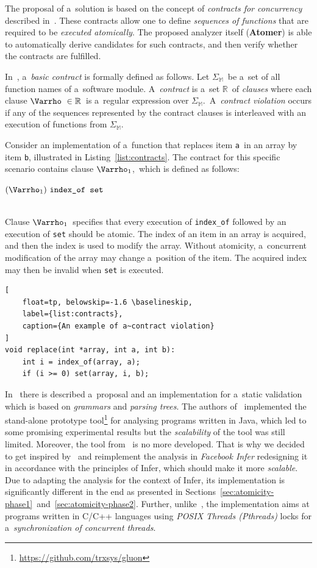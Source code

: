 \documentclass{ExcelAtFIT}
\begin{document}
The proposal of a~solution is based on the concept of
\emph{contracts for concurrency} described
in~\cite{atomicity-contracts}. These contracts
allow one to define \emph{sequences of functions} that are
required to be \emph{executed atomically}. The proposed
analyzer itself (\textbf{Atomer}) is able to automatically
derive candidates for such contracts, and then verify
whether the contracts are fulfilled.

In~\cite{atomicity-contracts},
a~\emph{basic contract} is formally defined as follows.
Let $ \Sigma_\mathbb{M} $~be a~set of all function names
of a~software module. A~\emph{contract} is
a~set $ \mathbb{R} $~of \emph{clauses} where each
clause $ \Varrho\ \in \mathbb{R} $~is a~regular
expression over $ \Sigma_\mathbb{M} $.~A~\emph{contract
violation} occurs if any of the sequences represented by
the contract clauses is interleaved with an execution of
functions from $ \Sigma_\mathbb{M} $.

Consider an implementation of a~function that replaces
item \texttt{a}~in an array by item \texttt{b},
illustrated in Listing~\ref{list:contracts}. The contract
for this specific scenario contains
clause $ \Varrho_1 $,~which is defined as follows:
\\[0.4em]
\centerline{$
    (\Varrho_1)\ \text{\texttt{index\_of~set}}
$}
\\[0.4em]
Clause $ \Varrho_1 $~specifies that every execution
of \texttt{index\_of} followed by an execution of
\texttt{set} should be atomic. The index of an
item in an array is acquired, and then the index
is used to modify the array. Without atomicity,
a~concurrent modification of the array may change
a~position of the item. The acquired index may
then be invalid when \texttt{set} is executed.

\begin{lstlisting}[
    float=tp, belowskip=-1.6 \baselineskip,
    label={list:contracts},
    caption={An example of a~contract violation}
]
void replace(int *array, int a, int b):
    int i = index_of(array, a);
    if (i >= 0) set(array, i, b);
\end{lstlisting}

In~\cite{atomicity-contracts} there is described
a~proposal and an implementation for a~static
validation which is based on \emph{grammars} and
\emph{parsing trees}. The authors
of~\cite{atomicity-contracts} implemented
the stand-alone prototype
tool\footnote{\url{https://github.com/trxsys/gluon}} for
analysing programs written in Java, which
led to some promising experimental results but the
\emph{scalability} of the tool was still limited. Moreover,
the tool from~\cite{atomicity-contracts} is no more
developed. That is why we decided to get inspired
by~\cite{atomicity-contracts} and reimplement the
analysis in \emph{Facebook Infer} redesigning it in
accordance with the principles of Infer, which
should make it more \emph{scalable}. Due to adapting the
analysis for the context of Infer, its
implementation is significantly different in the
end as presented in
Sections~\ref{sec:atomicity-phase1}~and~\ref{sec:atomicity-phase2}.
Further, unlike~\cite{atomicity-contracts},
the implementation aims at programs written in
C/C++ languages using \emph{POSIX Threads (Pthreads)}
locks for a~\emph{synchronization of concurrent
threads}.
\end{document}

